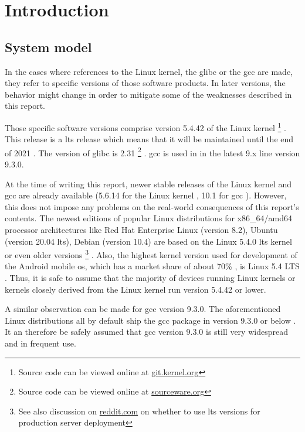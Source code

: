 \chapter{Introduction}
\label{chp:introduction}

\section{System model}
\label{sec:system-model}

In the cases where references to the Linux kernel, the \gls{glibc} or the \gls{gcc} are made, they refer to specific versions of those software products.
In later versions, the behavior might change in order to mitigate some of the weaknesses described in this report.

Those specific software versions comprise version 5.4.42 of the Linux kernel%
	\footnote{Source code can be viewed online at \href{https://git.kernel.org/stable/h/v5.4.42}{git.kernel.org}}%
.
This release is a \gls{lts} release which means that it will be maintained until the end of 2021 \cite{LKO2020}.
The version of \gls{glibc} is 2.31%
	\footnote{Source code can be viewed online at \href{https://sourceware.org/git/?p=glibc.git;a=tree;h=6ee690ef6fa36bf79d2e05b5a30a4f7e10ba3937;hb=9ea3686266dca3f004ba874745a4087a89682617}{sourceware.org}}%
.
\gls{gcc} is used in in the latest 9.x line version 9.3.0.

At the time of writing this report, newer stable releases of the Linux kernel and \gls{gcc} are already available (5.6.14 for the Linux kernel \cite{LKO2020a}, 10.1 for \gls{gcc} \cite{FSF2020}).
However, this does not impose any problems on the real-world consequences of this report's contents.
The newest editions of popular Linux distributions for x86\_64/amd64 processor architectures like Red Hat Enterprise Linux (version 8.2), Ubuntu (version 20.04 \gls{lts}), Debian (version 10.4) are based on the Linux 5.4.0 \gls{lts} kernel or even older versions%
	\footnote{See also discussion on \href{https://www.reddit.com/r/webhosting/comments/beg0z0/should_i_use_an_lts_version_of_ubuntu_for_my_web/}{reddit.com} on whether to use \gls{lts} versions for production server deployment}
\cite{RedHat2020,Canonical2020,SPI2020,SPI2020a}.
Also, the highest kernel version used for development of the Android mobile \gls{os}, which has a market share of about 70\% \cite{Statcounter2020}, is Linux 5.4 LTS \cite{GoogleLLC2020}.
Thus, it is safe to assume that the majority of devices running Linux kernels or kernels closely derived from the Linux kernel run version 5.4.42 or lower.

A similar observation can be made for \gls{gcc} version 9.3.0.
The aforementioned Linux distributions all by default ship the \gls{gcc} package in version 9.3.0 or below \cite{RedHat2020a,Canonical2020a,SPI2020b}.
It an therefore be safely assumed that \gls{gcc} version 9.3.0 is still very widespread and in frequent use.
